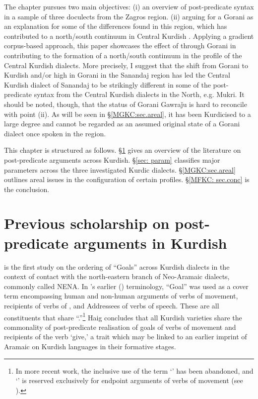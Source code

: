 \documentclass[output=paper,colorlinks,citecolor=brown]{langscibook}
\begin{document}
\begin{sloppypar}
The chapter pursues two main objectives: (i) an overview of post-predicate syntax in a sample of three doculects from the Zagros region. (ii) arguing for a Gorani  as an explanation for some of the differences found in this region, which has contributed to a north/south continuum in Central Kurdish . Applying a gradient corpus-based approach, this paper showcases the effect of  through Gorani  in contributing to the formation of a north/south continuum in the  profile of the Central Kurdish dialects. More precisely, I suggest that the shift from Gorani to Kurdish and/or high  in Gorani in the Sanandaj region has led the Central Kurdish dialect of Sanandaj to be strikingly different in some of the post-predicate syntax from the Central Kurdish dialects in the North, e.g. Mukri. It should be noted, though, that the status of Gorani Gawraǰu is hard to reconcile with point (ii). As will be seen in \S\ref{MGKC:sec.areal}, it has been Kurdicised to a large degree and cannot be regarded as an assumed original state of a Gorani dialect once spoken in the region. 

This chapter is structured as follows. \S\ref{MGKC: sec.2} gives an overview of the literature on post-predicate arguments across Kurdish. \S\ref{sec: param} classifies major  parameters across the three investigated Kurdic dialects. \S\ref{MGKC:sec.areal} outlines areal issues in the configuration of certain  profiles. \S\ref{MFKC: sec.conc} is the conclusion.


\section{Previous scholarship on post-predicate arguments in Kurdish} \label{MGKC: sec.2}

\citet{haig_verb-goal_2015} is the first study on the ordering of ``Goals'' across Kurdish dialects in the context of contact with the north-eastern branch of Neo-Aramaic dialects, commonly called NENA. In \citeauthor{haig_verb-goal_2015}'s earlier (\citeyear{haig_verb-goal_2015}) terminology, ``Goal''  was used as a cover term encompassing human and non-human arguments of verbs of movement, recipients of verbs of , and Addressees of verbs of speech. These are all constituents that share ``.''\footnote{In more recent work, the inclusive use of the term `' has been abandoned, and `' is reserved exclusively for endpoint arguments of verbs of movement (see ).} Haig concludes that all Kurdish varieties share the commonality of post-predicate realisation of goals of verbs of movement and recipients of the verb `give,' a  trait which may be linked to an earlier imprint of Aramaic on Kurdish languages in their formative stages.


\end{sloppypar}
\end{document}
